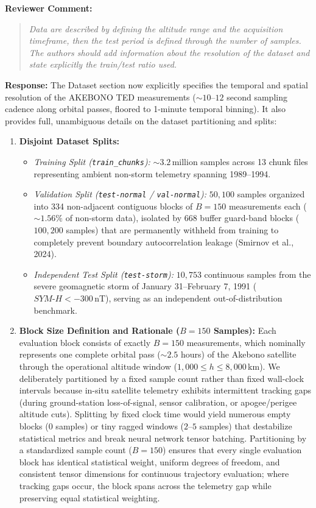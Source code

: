 \documentclass[a4paper,12pt]{article}
\newcommand{\reviewercomment}[1]{%
  \begin{samepage}%
  \par\noindent\textbf{Reviewer Comment:}\par
  \begin{quote}\itshape #1\end{quote}}
\newcommand{\filledresponse}[1]{%
  \par\noindent\textbf{Response:} #1\par
  \vspace{0.4cm}%
  \end{samepage}}
\begin{document}
\reviewercomment{Data are described by defining the altitude range and the acquisition timeframe, then the test
period is defined through the number of samples. The authors should add information about the
resolution of the dataset and state explicitly the train/test ratio used.}
\filledresponse{The Dataset section now explicitly specifies the temporal and spatial resolution of the AKEBONO TED measurements ($\sim 10$--$12$ second sampling cadence along orbital passes, floored to 1-minute temporal binning). It also provides full, unambiguous details on the dataset partitioning and splits:
\begin{enumerate}
    \item \textbf{Disjoint Dataset Splits:}
    \begin{itemize}
        \item \emph{Training Split (\texttt{train\_chunks}):} $\sim 3.2$\,million samples across 13 chunk files representing ambient non-storm telemetry spanning 1989--1994.
        \item \emph{Validation Split (\texttt{test-normal} / \texttt{val-normal}):} $50{,}100$ samples organized into 334 non-adjacent contiguous blocks of $B = 150$ measurements each ($\sim 1.56\%$ of non-storm data), isolated by 668 buffer guard-band blocks ($100{,}200$ samples) that are permanently withheld from training to completely prevent boundary autocorrelation leakage (Smirnov et al., 2024).
        \item \emph{Independent Test Split (\texttt{test-storm}):} $10{,}753$ continuous samples from the severe geomagnetic storm of January 31--February 7, 1991 ($SYM\text{-}H < -300$\,nT), serving as an independent out-of-distribution benchmark.
    \end{itemize}
    \item \textbf{Block Size Definition and Rationale ($B = 150$ Samples):} Each evaluation block consists of exactly $B = 150$ measurements, which nominally represents one complete orbital pass ($\sim 2.5$ hours) of the Akebono satellite through the operational altitude window ($1{,}000 \le h \le 8{,}000$\,km). We deliberately partitioned by a fixed sample count rather than fixed wall-clock intervals because in-situ satellite telemetry exhibits intermittent tracking gaps (during ground-station loss-of-signal, sensor calibration, or apogee/perigee altitude cuts). Splitting by fixed clock time would yield numerous empty blocks (0 samples) or tiny ragged windows ($2$--$5$ samples) that destabilize statistical metrics and break neural network tensor batching. Partitioning by a standardized sample count ($B = 150$) ensures that every single evaluation block has identical statistical weight, uniform degrees of freedom, and consistent tensor dimensions for continuous trajectory evaluation; where tracking gaps occur, the block spans across the telemetry gap while preserving equal statistical weighting.
\end{enumerate}}
\end{document}
